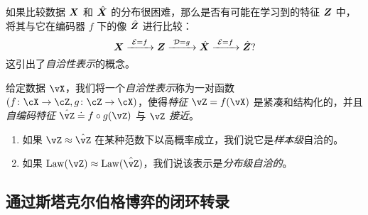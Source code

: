 \documentclass[../../book-main_zh.tex]{subfiles}
\begin{document}
如果比较数据 $\bm{X}$ 和 $\hat {\bm{X}}$ 的分布很困难，那么是否有可能在学习到的特征 $\bm{Z}$ 中，将其与它在编码器 $f$ 下的像 $\hat {\bm{Z}}$ 进行比较：
\begin{equation}
 \bm{X}
\xrightarrow{\hspace{1mm} \mathcal{E} = f \hspace{1mm}} \bm{Z}  \xrightarrow{\hspace{1mm} \mathcal{D} = g \hspace{1mm}} \hat{\bm{X}} \xrightarrow{\hspace{1mm} \mathcal{E} = f \hspace{1mm}} \hat {\bm{Z}}?
\label{eqn:closed-autoencoding}
\end{equation}
这引出了{\em 自洽性表示}的概念。
\begin{definition}[自洽性表示]\label{def:closed_loop}
    给定数据 \(\vX\)，我们将一个\textit{自洽性表示}称为一对函数 \((f \colon \cX \to \cZ, g \colon \cZ \to \cX)\)，使得\textit{特征} \(\vZ = f(\vX)\) 是紧凑和结构化的，并且\textit{自编码特征} \(\hat{\vZ} \doteq f \circ g(\vZ)\) 与 \(\vZ\) \textit{接近}。
    \begin{enumerate}
        \item 如果 \(\vZ \approx \hat{\vZ}\) 在某种范数下以高概率成立，我们说它是\textit{样本级}自洽的。
        \item 如果 \(\Law(\vZ) \approx \Law(\hat{\vZ})\)，我们说该表示是\textit{分布级自洽的}。
    \end{enumerate}
\end{definition}



\subsection{通过斯塔克尔伯格博弈的闭环转录}\label{sec:closed-loop-transcription}

\end{document}
